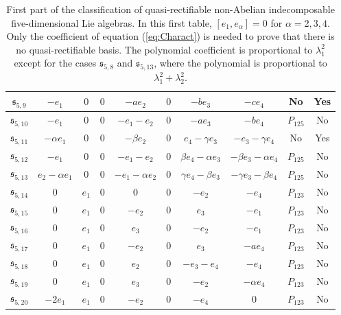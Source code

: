 \documentclass[12pt]{article}
\theoremstyle{plain}
\theoremstyle{definition}
\numberwithin{equation}{section}
\begin{document}
\begin{landscape}
\begin{table}[ht]
{\begin{tabular}{|c|c|c|c|c|c|c|c|c|c|}
             $\mathfrak{s}_{5,9} $  & $-e_1$ &$0$&$0$&$-a e_2$&$0$&$-be_3$&$-ce_4$&No& Yes\\
                     \hline
             $\mathfrak{s}_{5,10} $ &$-e_1$ & 0 &0&$-e_1-e_2$&$0$&$-a e_3$&$-be_4$&$P_{125}$& No\\
                     \hline
             $\mathfrak{s}_{5,11} $  &$-\alpha e_1$& 0 &0&$-\beta e_2$&$0$&$e_4-\gamma e_3$&$-e_3-\gamma e_4$&No& Yes\\
                \hline
             $\mathfrak{s}_{5,12} $  & $-e_1$ &$0$&$0$&$-e_1-e_2$&$0$&$\beta e_4-\alpha e_3$&$-\beta e_3-\alpha e_4$&$P_{125}$& No\\\hline
             $\mathfrak{s}_{5,13} $  & $e_2-\alpha e_1$ &$0$&$0$&$-e_1-\alpha e_2$&$0$&$\gamma e_4-\beta e_3$&$-\gamma e_3-\beta e_4$&$P_{125}$& No\\\hline
             $\mathfrak{s}_{5,14} $ & $0$ &$e_1$&$0$&$0$&$0$&$-e_2$&$-e_4$&$P_{123}$& No\\\hline
             $\mathfrak{s}_{5,15} $  & $0$ &$e_1$&$0$&$-e_2$&$0$&$e_3$&$-e_1$&$P_{123}$& No\\\hline
             $\mathfrak{s}_{5,16} $  & $0$ &$e_1$&$0$&$e_3$&$0$&$-e_2$&$-e_1$&$P_{123}$& No\\\hline
             $\mathfrak{s}_{5,17} $  & $0$ &$e_1$&$0$&$-e_2$&$0$&$e_3$&$-ae_4$&$P_{123}$& No\\\hline
             $\mathfrak{s}_{5,18} $  & $0$ &$e_1$&$0$&$e_2$&$0$&$-e_3-e_4$&$-e_4$&$P_{123}$& No\\\hline
             $\mathfrak{s}_{5,19} $  & $0$ &$e_1$&$0$&$e_3$&$0$&$-e_2$&$-\alpha e_4$&$P_{123}$& No\\\hline
             $\mathfrak{s}_{5,20} $  & $-2e_1$&$e_1$&$0$&$-e_2$&$0$&$-e_4$&$0$&$P_{123}$& No\\
        \hline
    \end{tabular}
    \caption{First part of the classification of quasi-rectifiable non-Abelian indecomposable five-dimensional Lie algebras. In this first table, $[e_1,e_\alpha]=0$ for $\alpha=2,3,4$. Only the coefficient of equation (\ref{eq:Charact}) is needed to prove that there is no quasi-rectifiable basis. The polynomial coefficient is proportional to $\lambda_1^2$ except for the cases $\mathfrak{s}_{5,8}$ and $\mathfrak{s}_{5,13}$, where the polynomial is proportional to $\lambda_1^2+\lambda_2^2$.}
    \label{fig:Lie-algebra-classification5}}
\end{table}
\end{landscape}
\end{document}
